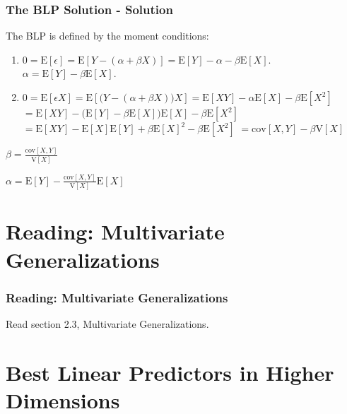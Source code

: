 \documentclass[12pt, block=fill]{beamer}
\newcommand{\E}{\text{E}}
\newcommand{\V}{\text{V}}
\newcommand{\cov}{\text{cov}}
\begin{document}
\begin{frame}[t]
  \frametitle{The BLP Solution - Solution}
    The BLP is defined by the moment conditions:
  \begin{enumerate}
\item $0 = \E[\epsilon] = \E \left[ Y - (\alpha + \beta X) \right] = \E[Y] - \alpha - \beta \E[X]$. $\alpha =  \E[Y]  - \beta \E[X]$.
\item $0 = \E[\epsilon X] = \E \left[ \big( Y - (\alpha + \beta X) \big) X \right]  = \E[XY] - \alpha\E[X] - \beta \E[X^2] $
$ =  \E[XY] - \Big( \E[Y]  - \beta \E[X]\Big)\E[X] - \beta \E[X^2] $
$ =  \E[XY] -  \E[X]\E[Y]  + \beta \E[X]^2 - \beta \E[X^2] $
$ = \cov[X,Y] - \beta \V[X] $
\end{enumerate}

$\beta = \frac{\cov[X,Y]}{\V[X]}$

$\alpha = \E[Y] - \frac{\cov[X,Y]}{\V[X]} \E[X]$
\end{frame}



%

\section{Reading: Multivariate Generalizations}

\begin{frame}
  \frametitle{Reading: Multivariate Generalizations}
  
  Read section 2.3, Multivariate Generalizations.
\end{frame}


\section{Best Linear Predictors in Higher Dimensions}
\end{document}
